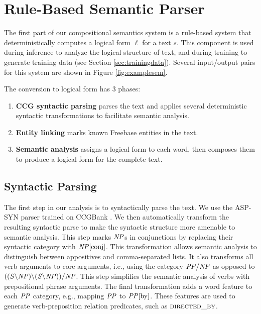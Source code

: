 \documentclass[11pt]{article}
\newcommand{\pred}[1]{\textsc{#1}}
\newcommand{\ccgsyn}[1]{\mbox{$\it{#1}$}}
\begin{document}


\section{Rule-Based Semantic Parser}
\label{sec:rule}

The first part of our compositional semantics system is a rule-based
system that deterministically computes a logical form $\ell$ for a
text $s$. This component is used during inference to analyze the
logical structure of text, and during training to generate training
data (see Section \ref{sec:trainingdata}).  Several input/output pairs
for this system are shown in Figure \ref{fig:examplesem}.

The conversion to logical form has 3 phases:

\begin{enumerate}
\item \textbf{CCG syntactic parsing} parses the text and applies
  several deterministic syntactic transformations to facilitate
  semantic analysis.
\item \textbf{Entity linking} marks known Freebase entities in the
  text.
\item \textbf{Semantic analysis} assigns a logical form to each word,
  then composes them to produce a logical form for the complete text.
\end{enumerate}

\subsection{Syntactic Parsing}

The first step in our analysis is to syntactically parse the text. We
use the \textsc{ASP-SYN} parser \cite{krishnamurthy2014} trained on
CCGBank \cite{hockenmaier02ccgbank}. We then automatically transform
the resulting syntactic parse to make the syntactic structure more
amenable to semantic analysis. This step marks \ccgsyn{NP}s in
conjunctions by replacing their syntactic category with
\ccgsyn{NP[\mbox{conj}]}. This transformation allows semantic analysis to
distinguish between appositives and comma-separated lists. It also
transforms all verb arguments to core arguments, i.e., using the
category \ccgsyn{PP/NP} as opposed to \ccgsyn{((S\backslash
  NP)\backslash (S\backslash NP))/NP}. This step simplifies the
semantic analysis of verbs with prepositional phrase arguments. The
final transformation adds a word feature to each \ccgsyn{PP} category,
e.g., mapping \ccgsyn{PP} to \ccgsyn{PP[\mbox{by}]}. These features are used
to generate verb-preposition relation predicates, such as
$\pred{directed\_by}$.
\end{document}
